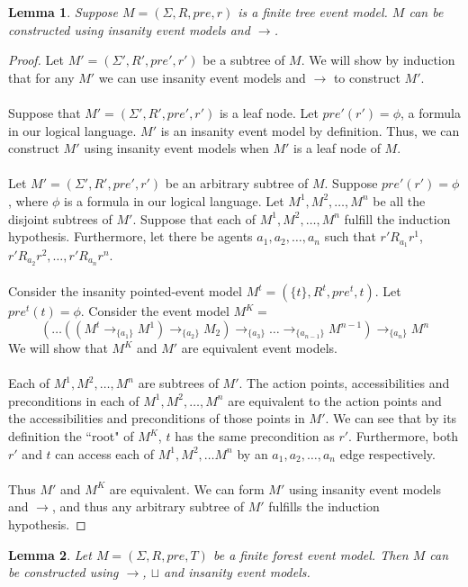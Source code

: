 \documentclass[12pt, a4paper, titlepage]{scrartcl}
\newtheorem{lemma}{Lemma}[section]
\numberwithin{equation}{section}
\begin{document}
\begin{lemma}
Suppose $M = (\Sigma, R, pre, r)$ is a finite tree event model.
$M$ can be constructed using insanity event models and $\to$.
\end{lemma}
\begin{proof}
Let $M' = (\Sigma', R', pre', r')$ be a subtree of $M$.
We will show by induction that for any $M'$ we can use insanity event models and $\to$ to
construct $M'$.\\
\\
Suppose that $M' = (\Sigma', R', pre', r')$ is a leaf node.
Let $pre'(r') = \phi$, a formula in our logical language.
$M'$ is an insanity event model by definition.
Thus, we can construct $M'$ using insanity event models when $M'$ is a leaf node of $M$.\\
\\
Let $M' = (\Sigma', R', pre', r')$ be an arbitrary subtree of $M$.
Suppose $pre'(r') = \phi$, where $\phi$ is a formula in our logical language.
Let $M^1, M^2, \ldots, M^n$ be all the disjoint subtrees of $M'$.
Suppose that each of $M^1, M^2, \ldots, M^n$ fulfill the induction hypothesis.
Furthermore, let there be agents $a_1, a_2, \ldots, a_n$ such that $r' R_{a_1} r^1$, $r' R_{a_2} r^2,
	\ldots, r' R_{a_n} r^n$.\\
\\
Consider the insanity pointed-event model $M^t = (\{ t \}, R^t, pre^t, t)$.
Let $pre^t(t) = \phi$.
Consider the event model $M^K = $
\[
(\ldots((M^t \to_{\{a_1\}} M ^ 1) \to_{\{a_2\}} M_2) \to_{\{a_3\}} \ldots
\to_{\{a_{n-1}\}} M^{n-1} ) \to_{\{a_n\}} M ^ n
\]
We will show that $M^K$ and $M'$ are equivalent event models.\\
\\
Each of $M^1, M^2, \ldots, M^n$ are subtrees of $M'$.
The action points, accessibilities and preconditions in each of $M^1, M^2, \ldots, M^n$ are
equivalent to the action points and the accessibilities and preconditions of those points in $M'$.
We can see that by its definition the ``root" of $M^K$, $t$ has the same precondition as $r'$.
Furthermore, both $r'$ and $t$ can access each of $M^1, M^2, \ldots M^n$ by an $a_1, a_2, \ldots, a_n$ edge
respectively.\\
\\
Thus $M'$ and $M^K$ are equivalent.
We can form $M'$ using insanity event models and $\to$, and thus any arbitrary subtree of $M'$
fulfills the induction hypothesis.
\end{proof}

\begin{lemma}
Let $M = (\Sigma, R, pre, T)$ be a finite forest event model.
Then $M$ can be constructed using $\to$, $\sqcup$ and insanity event models.
\end{lemma}
\end{document}
